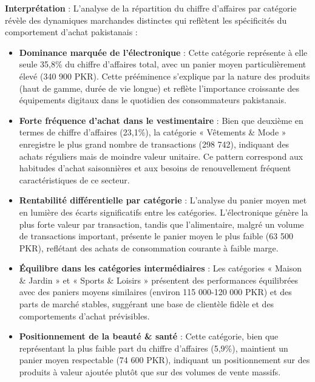 \documentclass[a4paper,12pt]{article}
\begin{document}
\textbf{Interprétation} :
L'analyse de la répartition du chiffre d'affaires par catégorie révèle des dynamiques marchandes distinctes qui reflètent les spécificités du comportement d'achat pakistanais :

\begin{itemize}
    \item \textbf{Dominance marquée de l'électronique} : Cette catégorie représente à elle seule 35,8\% du chiffre d'affaires total, avec un panier moyen particulièrement élevé (340 900 PKR). Cette prééminence s'explique par la nature des produits (haut de gamme, durée de vie longue) et reflète l'importance croissante des équipements digitaux dans le quotidien des consommateurs pakistanais.
    
    \item \textbf{Forte fréquence d'achat dans le vestimentaire} : Bien que deuxième en termes de chiffre d'affaires (23,1\%), la catégorie « Vêtements \& Mode » enregistre le plus grand nombre de transactions (298 742), indiquant des achats réguliers mais de moindre valeur unitaire. Ce pattern correspond aux habitudes d'achat saisonnières et aux besoins de renouvellement fréquent caractéristiques de ce secteur.
    
    \item \textbf{Rentabilité différentielle par catégorie} : L'analyse du panier moyen met en lumière des écarts significatifs entre les catégories. L'électronique génère la plus forte valeur par transaction, tandis que l'alimentaire, malgré un volume de transactions important, présente le panier moyen le plus faible (63 500 PKR), reflétant des achats de consommation courante à faible marge.
    
    \item \textbf{Équilibre dans les catégories intermédiaires} : Les catégories « Maison \& Jardin » et « Sports \& Loisirs » présentent des performances équilibrées avec des paniers moyens similaires (environ 115 000-120 000 PKR) et des parts de marché stables, suggérant une base de clientèle fidèle et des comportements d'achat prévisibles.
    
    \item \textbf{Positionnement de la beauté \& santé} : Cette catégorie, bien que représentant la plus faible part du chiffre d'affaires (5,9\%), maintient un panier moyen respectable (74 600 PKR), indiquant un positionnement sur des produits à valeur ajoutée plutôt que sur des volumes de vente massifs.
\end{itemize}
\end{document}
